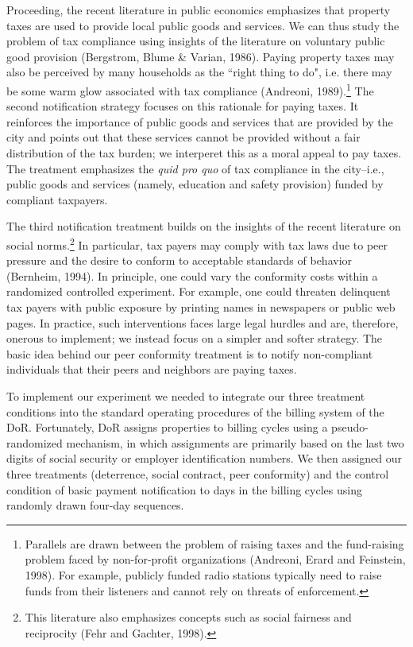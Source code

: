 \documentclass[12pt,titlepage]{article}
\begin{document}
Proceeding, the recent literature in public economics emphasizes that property
taxes are used to provide local public goods and services. We can
thus study the problem of tax compliance using insights of the literature
on voluntary public good provision (Bergstrom, Blume \& Varian,
1986). Paying property taxes may also be perceived by many households as the
``right thing to do", i.e. there may be some warm glow associated with tax
compliance (Andreoni, 1989).\footnote{ Parallels are drawn between the
  problem of raising taxes and the fund-raising problem faced by
  non-for-profit organizations (Andreoni, Erard and Feinstein,
  1998). For example, publicly funded radio stations typically need to
  raise funds from their listeners and cannot rely on threats of
  enforcement.}  The second notification strategy focuses on this
rationale for paying taxes. It reinforces the importance of public
goods and services that are provided by the city and points out that
these services cannot be provided without a fair distribution of the
tax burden; we interperet this as a moral appeal to pay taxes. The
treatment emphasizes the \textit{quid pro quo} of tax compliance in
the city--i.e., public goods and services (namely, education and safety
provision) funded by compliant taxpayers.

The third notification treatment builds on the insights of the
recent literature on social norms.\footnote{This literature also
  emphasizes concepts such as social fairness and reciprocity (Fehr
  and Gachter, 1998).} In particular, tax payers may comply with tax
laws due to peer pressure and the desire to conform to acceptable
standards of behavior (Bernheim, 1994). In principle, one could vary
the conformity costs within a randomized controlled experiment. For
example, one could threaten delinquent tax payers with public exposure
by printing names in newspapers or public web pages. In practice, such
interventions faces large legal hurdles and are, therefore,
onerous to implement; we instead focus on a simpler and softer
strategy.  The basic idea behind our peer conformity treatment is to
notify non-compliant individuals that their peers and neighbors are
paying taxes.

To implement our experiment we needed to integrate our three treatment
conditions into the standard operating procedures of the billing
system of the DoR. Fortunately, DoR assigns properties to billing
cycles using a pseudo-randomized mechanism, in which assignments are
primarily based on the last two digits of social security or employer
identification numbers.  We then assigned our three treatments
(deterrence, social contract, peer conformity) and the control condition
of basic payment notification to days in the billing cycles using randomly
drawn four-day sequences.
\end{document}
